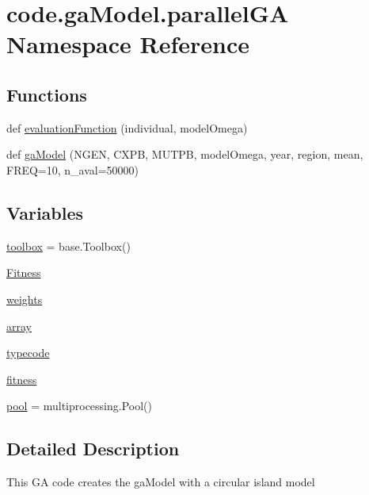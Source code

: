 \hypertarget{namespacecode_1_1ga_model_1_1parallel_g_a}{}\section{code.\+ga\+Model.\+parallel\+GA Namespace Reference}
\label{namespacecode_1_1ga_model_1_1parallel_g_a}
\subsection*{Functions}
\begin{DoxyCompactItemize}
\item 
def \hyperlink{namespacecode_1_1ga_model_1_1parallel_g_a_aa9d1048007f567adaa88457299a1069e}{evaluation\+Function} (individual, model\+Omega)
\item 
def \hyperlink{namespacecode_1_1ga_model_1_1parallel_g_a_a287be72055dc127ce0c97fdf02db9e04}{ga\+Model} (N\+G\+EN, C\+X\+PB, M\+U\+T\+PB, model\+Omega, year, region, mean, F\+R\+EQ=10, n\+\_\+aval=50000)
\end{DoxyCompactItemize}
\subsection*{Variables}
\begin{DoxyCompactItemize}
\item 
\hyperlink{namespacecode_1_1ga_model_1_1parallel_g_a_a10750472daab47d438b55c8acc9d1ae7}{toolbox} = base.\+Toolbox()
\item 
\hyperlink{namespacecode_1_1ga_model_1_1parallel_g_a_a7755e12a4252f1d98a695e94f5bd9488}{Fitness}
\item 
\hyperlink{namespacecode_1_1ga_model_1_1parallel_g_a_ae9e3d434ef9c732e94671f9edeccfc28}{weights}
\item 
\hyperlink{namespacecode_1_1ga_model_1_1parallel_g_a_a39d5b5a2692ac279d7dd14176f89b2b1}{array}
\item 
\hyperlink{namespacecode_1_1ga_model_1_1parallel_g_a_abfa9d1ff6b30551c6dc5fef8f293eae0}{typecode}
\item 
\hyperlink{namespacecode_1_1ga_model_1_1parallel_g_a_af7c1add0868b0cc53a3bf25bb8f60bd1}{fitness}
\item 
\hyperlink{namespacecode_1_1ga_model_1_1parallel_g_a_a57e5094d347bdbee07a41fe72a846b17}{pool} = multiprocessing.\+Pool()
\end{DoxyCompactItemize}


\subsection{Detailed Description}
\begin{DoxyVerb}This GA code creates the gaModel with a circular island model\end{DoxyVerb}
 

